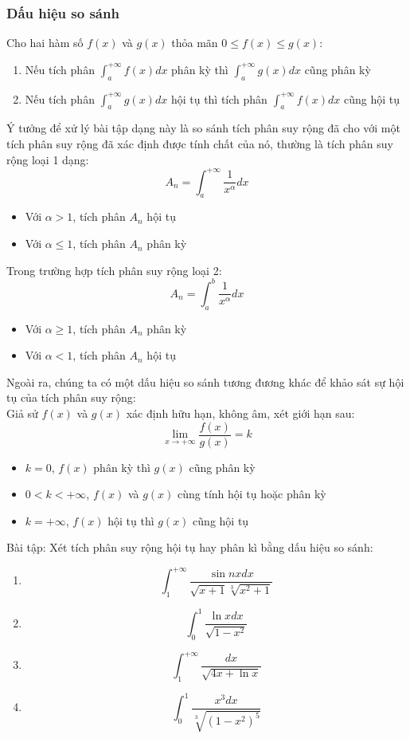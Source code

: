 \documentclass{article}
\begin{document}
\subsubsection{Dấu hiệu so sánh}
Cho hai hàm số $f(x)$ và $g(x)$ thỏa mãn $0\leq f(x)\leq g(x)$:
\begin{enumerate}
    \item Nếu tích phân $\int_{a}^{+\infty}f(x)dx$ phân kỳ thì $\int_{a}^{+\infty}g(x)dx$ cũng phân kỳ
    \item Nếu tích phân $\int_{a}^{+\infty}g(x)dx$ hội tụ thì tích phân $\int_{a}^{+\infty}f(x)dx$ cũng hội tụ
\end{enumerate}
Ý tưởng để xử lý bài tập dạng này là so sánh tích phân suy rộng đã cho với một tích phân suy rộng đã xác định được tính chất của nó, thường là tích phân suy rộng loại 1 dạng: $$A_{n}=\int_{a}^{+\infty}\frac{1}{x^\alpha}dx$$
\begin{itemize}
\item  Với $\alpha>1$, tích phân $A_{n}$ hội tụ
\item  Với $\alpha \leq 1$, tích phân $A_{n}$ phân kỳ
\end{itemize}
Trong trường hợp tích phân suy rộng loại 2: $$A_{n}=\int_{a}^{b}\frac{1}{x^\alpha}dx$$
\begin{itemize}
\item Với $\alpha \geq 1$, tích phân $A_{n}$ phân kỳ
\item Với $\alpha<1$, tích phân $A_{n}$ hội tụ
\end{itemize}
Ngoài ra, chúng ta có một dấu hiệu so sánh tương đương khác để khảo sát sự hội tụ của tích phân suy rộng:
\\ Giả sử $f(x)$ và $g(x)$ xác định hữu hạn, không âm, xét giới hạn sau: $$\lim_{x\to+\infty}\frac{f(x)}{g(x)}=k$$
\begin{itemize}
    \item $k=0$, $f(x)$ phân kỳ thì $g(x)$ cũng phân kỳ
    \item $0<k<+\infty$, $f(x)$ và $g(x)$ cùng tính hội tụ hoặc phân kỳ
    \item $k=+\infty$, $f(x)$ hội tụ thì $g(x)$ cũng hội tụ
\end{itemize}
Bài tập: Xét tích phân suy rộng hội tụ hay phân kì bằng dấu hiệu so sánh:
\begin{enumerate}
    \item $$\int_{1}^{+\infty}\frac{\sin{nx}dx}{\sqrt{x+1}\sqrt[3]{x^2+1}}$$
    \item $$\int_{0}^{1}\frac{\ln{x}dx}{\sqrt{1-x^2}}$$
    \item $$\int_{1}^{+\infty}\frac{dx}{\sqrt{4x+\ln{x}}}$$
    \item $$\int_{0}^{1}\frac{x^3dx}{\sqrt[3]{(1-x^2)^5}}$$
\end{enumerate}
\end{document}
